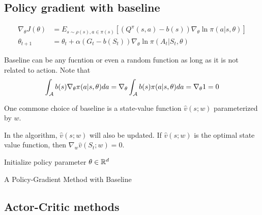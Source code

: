\begin{refsection}
\begin{remark}
\end{remark}



\subsection{Policy gradient with baseline}

\begin{align*}
\nabla_{\theta} J(\theta) &= E_{s\sim \rho(s),a\in\pi(s)}[(Q^\pi(s,a) - b(s))\nabla_{\theta}\ln \pi(a|s,\theta)] \\
\theta_{t+1} &= \theta_t + \alpha(G_t - b(S_t))\nabla_{\theta}\ln \pi(A_t|S_t,\theta)  
\end{align*}

Baseline can be any fucntion or even a random function as long as it is not related to action. Note that
$$\int_{\mathcal{A}} b(s)\nabla_{\theta}\pi(a|s,\theta)da = \nabla_{\theta}\int_{\mathcal{A}} b(s)\pi(a|s,\theta)da = \nabla_{\theta} 1  = 0 $$

One commone choice of baseline is a state-value function $\hat{v}(s;w)$ parameterized by $w$. 

In the algorithm, $\hat{v}(s;w)$ will also be updated. If $\hat{v}(s;w)$ is the optimal state value function, then $\nabla_w \hat{v}(S_t;w) = 0$.

\begin{algorithm}
	Initialize policy parameter $\theta\in \mathbb{R}^d$\\
	\caption{A Policy-Gradient Method with Baseline}
\end{algorithm}


\subsection{Actor-Critic methods}


\end{refsection}
